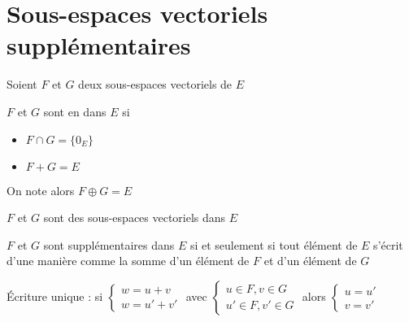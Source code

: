 \section{Sous-espaces vectoriels supplémentaires}

\begin{frame}
Soient $F$ et $G$ deux sous-espaces vectoriels de $E$
\begin{mydefinition}
$F$ et $G$ sont en  dans $E$ si 
\begin{itemize}
  \item $F \cap G = \{ 0_E \}$
  \item $F+G=E$
\end{itemize}
\end{mydefinition}
\pause
On note alors $F \oplus G=E$

\pause
$F$ et $G$ sont des sous-espaces vectoriels  dans $E$

\pause
\begin{proposition}
\label{prop:directeunique}
$F$ et $G$ sont supplémentaires dans $E$ si et seulement si tout 
élément de $E$ s'écrit d'une manière  
comme la somme d'un élément de $F$ et d'un élément de $G$
\end{proposition}

\pause
\medskip

{\small \'Ecriture unique : si $\left\{\begin{array}{l}w=u+v\\w=u'+v' \end{array}\right.$  avec 
$\left\{\begin{array}{l}u\in F, v\in G\\ u'\in F, v'\in G\end{array}\right.$
alors $\left\{\begin{array}{l}u=u'\\v=v'\end{array}\right.$}
\end{frame}


